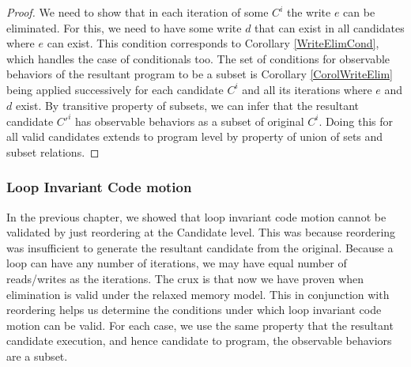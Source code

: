         \begin{proof}
            
            We need to show that in each iteration of some $C^i$ the write $e$ can be eliminated. 
            For this, we need to have some write $d$ that can exist in all candidates where $e$ can exist. 
            This condition corresponds to Corollary \ref{WriteElimCond}, which handles the case of conditionals too. 
            The set of conditions for observable behaviors of the resultant program to be a subset is Corollary \ref{CorolWriteElim} being applied successively for each candidate $C^i$ and all its iterations where $e$ and $d$ exist. 
            By transitive property of subsets, we can infer that the resultant candidate $C'^i$ has observable behaviors as a subset of original $C^i$. 
            Doing this for all valid candidates extends to program level by property of union of sets and subset relations\footnotemark.
    
                
        \end{proof}
         

        \subsubsection{Loop Invariant Code motion}  

            In the previous chapter, we showed that loop invariant code motion cannot be validated by just reordering at the Candidate level. 
            This was because reordering was insufficient to generate the resultant candidate from the original. 
            Because a loop can have any number of iterations, we may have equal number of reads/writes as the iterations. 
            The crux is that now we have proven when elimination is valid under the relaxed memory model. 
            This in conjunction with reordering helps us determine the conditions under which loop invariant code motion can be valid.
            For each case, we use the same property that the resultant candidate execution, and hence candidate to program, the observable behaviors are a subset. 

